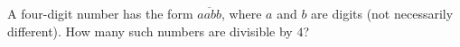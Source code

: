 A four-digit number has the form $\overline{aabb}$, where $a$ and $b$ are digits (not necessarily different). How many such numbers are divisible by $4$?
